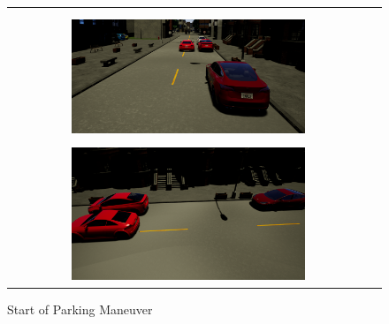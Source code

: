 \begin{figure}
    \begin{tabular}{c|c}
         \includegraphics[width=7cm, height=4cm]{images/position1.png} 
         \includegraphics[width=7cm, height=4cm]{images/position2.png}
    \end{tabular}
    \caption{Start of Parking Maneuver}
    \label{fig:startPosition}
\end{figure}

